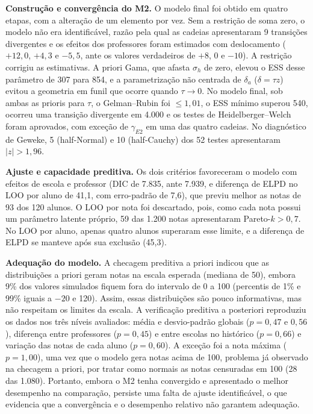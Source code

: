 \documentclass[11pt,a4paper]{article}
\begin{document}
\textbf{Construção e convergência do M2.} O modelo final foi obtido em quatro etapas, com a
alteração de um elemento por vez. Sem a restrição de soma zero, o modelo não era
identificável, razão pela qual as cadeias apresentaram 9 transições divergentes e os efeitos
dos professores foram estimados com deslocamento ($+12{,}0$, $+4{,}3$ e $-5{,}5$, ante os
valores verdadeiros de $+8$, 0 e $-10$). A restrição corrigiu as estimativas. A priori Gama,
que afasta $\sigma_h$ de zero, elevou o ESS desse parâmetro de 307 para 854, e a
parametrização não centrada de $\delta_a$ ($\delta = \tau z$) evitou a geometria em funil que
ocorre quando $\tau \to 0$. No modelo final, sob ambas as prioris para $\tau$, o Gelman--Rubin
foi $\le 1{,}01$, o ESS mínimo superou 540, ocorreu uma transição divergente em 4.000 e os
testes de Heidelberger--Welch foram aprovados, com exceção de $\gamma_{E2}$ em uma das quatro
cadeias. No diagnóstico de Geweke, 5 (half-Normal) e 10 (half-Cauchy) dos 52 testes
apresentaram $|z| > 1{,}96$.

\textbf{Ajuste e capacidade preditiva.} Os dois critérios favoreceram o modelo com efeitos de
escola e professor (DIC de 7.835, ante 7.939, e diferença de ELPD no LOO por aluno de 41,1, com
erro-padrão de 7,6), que previu melhor as notas de 93 dos 120 alunos. O LOO por nota foi
descartado, pois, como cada nota possui um parâmetro latente próprio, 59 das 1.200 notas
apresentaram Pareto-$k > 0{,}7$. No LOO por aluno, apenas quatro alunos superaram esse limite,
e a diferença de ELPD se manteve após sua exclusão (45,3).

\textbf{Adequação do modelo.} A checagem preditiva a priori indicou que as distribuições a
priori geram notas na escala esperada (mediana de 50), embora 9\% dos valores simulados fiquem
fora do intervalo de 0 a 100 (percentis de 1\% e 99\% iguais a $-20$ e 120). Assim, essas
distribuições são pouco informativas, mas não respeitam os limites da escala. A verificação
preditiva a posteriori reproduziu os dados nos três níveis avaliados: média e desvio-padrão
globais ($p = 0{,}47$ e $0{,}56$), diferença entre professores ($p = 0{,}45$) e entre escolas
no histórico ($p = 0{,}66$) e variação das notas de cada aluno ($p = 0{,}60$). A exceção foi a
nota máxima ($p = 1{,}00$), uma vez que o modelo gera notas acima de 100, problema já observado
na checagem a priori, por tratar como normais as notas censuradas em 100 (28 das 1.080).
Portanto, embora o M2 tenha convergido e apresentado o melhor desempenho na comparação,
persiste uma falta de ajuste identificável, o que evidencia que a convergência e o desempenho
relativo não garantem adequação.
\end{document}
